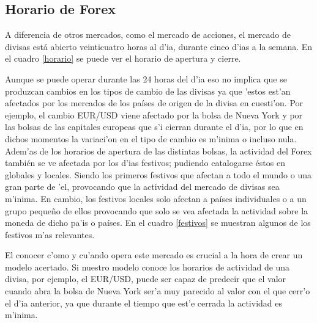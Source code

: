 \subsection{Horario de Forex}

A diferencia de otros mercados, como el mercado de acciones, el mercado de divisas está abierto veinticuatro horas al d'ia, durante cinco d'ias a la semana. En el cuadro \ref{horario} se puede ver el horario de apertura y cierre.



Aunque se puede operar durante las 24 horas del d'ia eso no implica que se produzcan cambios en los tipos de cambio de las divisas ya que 'estos est'an afectados por los mercados de los países de origen de la divisa en cuesti'on. Por ejemplo, el cambio EUR/USD viene afectado por la bolsa de Nueva York y por las bolsas de las capitales europeas que s'i cierran durante el d'ia, por lo que en dichos momentos la variaci'on en el tipo de cambio es m'inima o incluso nula.  
Adem'as de los horarios de apertura de las distintas bolsas, la actividad del Forex también se ve afectada por los d'ias festivos; pudiendo catalogarse éstos en globales y locales. Siendo los primeros festivos que afectan a todo el mundo o una gran parte de 'el, provocando que la actividad del mercado de divisas sea m'inima.  
En cambio, los festivos locales solo afectan a países individuales o a un grupo pequeño de ellos provocando que solo se vea afectada la actividad sobre la moneda de dicho pa'is o países. En el cuadro \ref{festivos} se muestran algunos de los festivos m'as relevantes.



El conocer c'omo y cu'ando opera este mercado es crucial a la hora de crear un modelo acertado.  
Si nuestro modelo conoce los horarios de actividad de una divisa, por ejemplo, el EUR/USD, puede ser capaz de predecir que el valor cuando abra la bolsa de Nueva York ser'a muy parecido al valor con el que cerr'o el d'ia anterior, ya que durante el tiempo que est'e cerrada la actividad es m'inima. 

